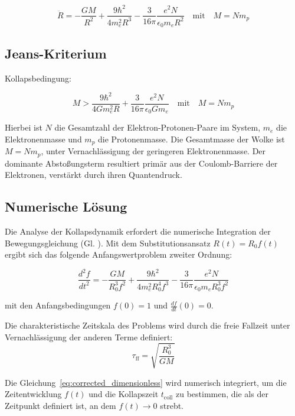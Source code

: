 \begin{equation}
    \label{eq:bewegungsgleichung}
    \ddot{R} = -\frac{G M}{R^2} + \frac{9 \hbar^2}{4 m_e^2 R^3} - \frac{3}{16\pi} \frac{e^2 N}{\epsilon_0 m_e R^2}
    \quad \text{mit} \quad M = N m_p
\end{equation}

\subsection{Jeans-Kriterium}
Kollapsbedingung:

\begin{equation}
    M > \frac{9 \hbar^2}{4 G m_e^2 R} + \frac{3}{16\pi} \frac{e^2 N}{\epsilon_0 G m_e}
    \quad \text{mit} \quad M = N m_p
\end{equation}

Hierbei ist $N$ die Gesamtzahl der Elektron-Protonen-Paare im System, $m_e$ die Elektronenmasse und $m_p$ die Protonenmasse. Die Gesamtmasse der Wolke ist $M = N m_p$, unter Vernachlässigung
der geringeren Elektronenmasse. Der dominante Abstoßungsterm resultiert primär aus der Coulomb-Barriere der Elektronen, verstärkt durch ihren Quantendruck.

\subsection{Numerische Lösung}
Die Analyse der Kollapsdynamik erfordert die numerische Integration der Bewegungsgleichung (Gl. ). Mit dem Substitutionsansatz $R(t) = R_0 f(t)$ ergibt sich das folgende
Anfangswertproblem zweiter Ordnung:

\begin{equation}
\label{eq:corrected_dimensionless}
\frac{d^{2}f}{dt^{2}} = -\frac{G M}{R_{0}^{3} f^{2}} + \frac{9 \hbar^{2}}{4 m_e^{2} R_{0}^{4} f^{3}} - \frac{3}{16\pi} \frac{e^{2} N}{\epsilon_{0} m_e R_{0}^{3} f^{2}}
\end{equation}

\noindent mit den Anfangsbedingungen $f(0) = 1$ und $\frac{df}{dt}(0) = 0$.

Die charakteristische Zeitskala des Problems wird durch die freie Fallzeit unter Vernachlässigung der anderen Terme definiert:
\[
\tau_{\text{ff}} = \sqrt{\frac{R_0^3}{G M}}
\]

Die Gleichung~\ref{eq:corrected_dimensionless} wird numerisch integriert, um die Zeitentwicklung $f(t)$ und die Kollapszeit $t_{\text{coll}}$ zu bestimmen, die als der Zeitpunkt definiert ist,
an dem $f(t) \rightarrow 0$ strebt.


